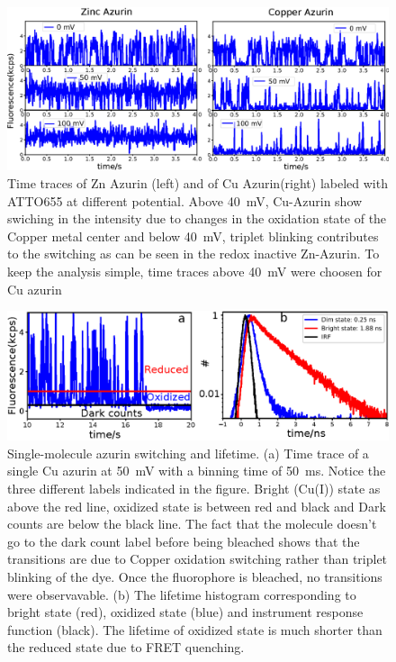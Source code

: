 \documentclass[11pt,a4paper,onecolumn]{article}
\begin{document}
\begin{figure}
  \centering
  \includegraphics[width=\textwidth,keepaspectratio]{SI_timetrace_Zn_Cu.eps}
  \makeatletter
  \renewcommand{\fnum@figure}{\figurename~S\thefigure}
  \makeatother
  \caption{Time traces of Zn Azurin (left) and of Cu Azurin(right) labeled with ATTO655 at different potential. 
  Above \SI{40}{\mV}, Cu-Azurin show swiching in the intensity due to changes in the oxidation state of the Copper metal center and below \SI{40}{\mV}, triplet blinking contributes to the switching as can be seen in the redox inactive Zn-Azurin.
  To keep the analysis simple, time traces above \SI{40}{\mV} were choosen for Cu azurin}
  \label{SIfig:tracecomparision}
\end{figure}
\begin{figure}
  \centering
  \includegraphics{lifetime.eps}
  \makeatletter
  \renewcommand{\fnum@figure}{\figurename~S\thefigure
}  \makeatother
  \caption{Single-molecule azurin switching and lifetime. (a) Time trace of a single Cu azurin at \SI{50}{\mV} with a binning time of \SI{50}{\ms}.
  Notice the three different labels indicated in the figure. Bright (Cu(I)) state as above the red line, oxidized state is between red and black and Dark counts are below the black line. The fact that the molecule doesn't go to the dark count label before being bleached shows that the transitions are due to Copper oxidation switching rather than triplet blinking of the dye.
  Once the fluorophore is bleached, no transitions were observavable.
  (b) The lifetime histogram corresponding to bright state (red), oxidized state (blue) and instrument response function (black).
  The lifetime of oxidized state is much shorter than the reduced state due to FRET quenching.}
  \label{SIfig: lifetime}
\end{figure}
\end{document}
